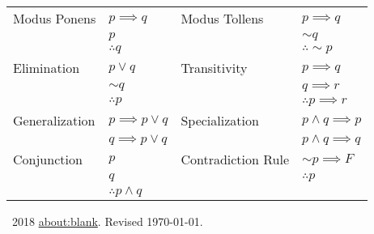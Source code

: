 \documentclass[10pt,letterpaper]{article}
\newcommand{\AND}{\wedge}
\newcommand{\OR}{\vee}
\begin{document}
\begin{doublespace}
\begin{center}
\begin{tabular}{|ll|ll|}
\hline
Modus Ponens & $p\implies q$  & Modus Tollens & $p\implies q$\\
             & $p$            &               & $\sim q$ \\ 
             & $\therefore q$ &               & $\therefore \sim p$ \\ 
             \hline
Elimination  & $p \OR q$      & Transitivity  & $p \implies q$ \\
             & $\sim q$       &               & $q \implies r$ \\
             & $\therefore p$ &               & $\therefore p \implies r$ \\
             \hline
Generalization & $p \implies p\OR q$ & Specialization & $p \AND q \implies p$ \\
               & $q \implies p\OR q$ &                & $p \AND q \implies q$ \\
             
\hline
Conjunction   &  $p$                          & Contradiction Rule & $\sim p \implies F$ \\
              &  $q$                          &                    & $\therefore p $\\
              &  $\therefore p \AND q$        & &\\
              \hline

\end{tabular}
 
\end{center}
\end{doublespace}

\vspace{1.5cm}
\begin{small}
\noindent \textcopyleft\ 2018 \href{http://about:blank}{about:blank}. Revised \today. 
\end{small}
\end{document}
